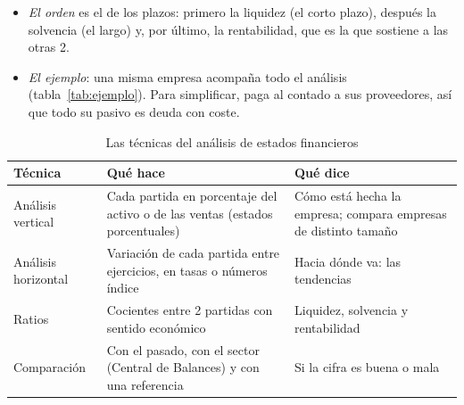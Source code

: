 \documentclass[11pt]{article}
\begin{document}
\begin{itemize}
  \begin{itemize}
  \item desde 2016, la Autoridad Europea de Valores y Mercados (ESMA) exige que las cotizadas las definan, las concilien con las cuentas y no les den más relieve que a estas\nocite{ESMA2015APM};
  \item y la NIIF~18~obliga desde 2027 a presentar en la cuenta de resultados de los grupos cotizados un resultado de explotación y un resultado antes de financiación e impuestos con una definición común, y a conciliar en la memoria las \emph{medidas de rendimiento definidas por la dirección}\nocite{IASB2024NIIF18,UE2026NIIF18}.
  \end{itemize}
\item \emph{El orden} es el de los plazos: primero la liquidez (el corto plazo), después la solvencia (el largo) y, por último, la rentabilidad, que es la que sostiene a las otras 2.
\item \emph{El ejemplo}: una misma empresa acompaña todo el análisis (tabla~\ref{tab:ejemplo}). Para simplificar, paga al contado a sus proveedores, así que todo su pasivo es deuda con coste.
\end{itemize}

\begin{table}[H]
\centering
\caption{Las técnicas del análisis de estados financieros}\label{tab:metodos-analisis}
\small
\renewcommand{\arraystretch}{1.25}
\begin{tabular}{>{\raggedright\arraybackslash}m{3.1cm}>{\raggedright\arraybackslash}m{5.6cm}>{\raggedright\arraybackslash}m{5.2cm}}
\toprule
\rowcolor{tceeazulpalido}\textbf{Técnica} & \textbf{Qué hace} & \textbf{Qué dice} \\
\midrule
Análisis vertical & Cada partida en porcentaje del activo o de las ventas (estados porcentuales) & Cómo está hecha la empresa; compara empresas de distinto tamaño \\
Análisis horizontal & Variación de cada partida entre ejercicios, en tasas o números índice & Hacia dónde va: las tendencias \\
Ratios & Cocientes entre 2 partidas con sentido económico & Liquidez, solvencia y rentabilidad \\
Comparación & Con el pasado, con el sector (Central de Balances) y con una referencia & Si la cifra es buena o mala \\
\bottomrule
\end{tabular}
\end{table}
\end{document}
